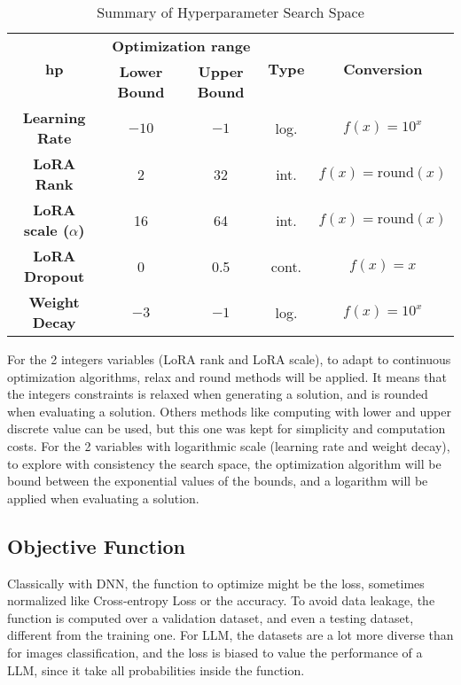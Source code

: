 \vspace*{-\baselineskip}
\begin{table}[h]
    \centering
    \begin{tabular}{|c|c|c|c|c|}
        \hline
        \multirow{2}{*}{\textbf{ \Gls{hp} }} & \multicolumn{2}{|c|}{\textbf{Optimization range}} &\multirow{2}{*}{\textbf{ Type }}& \multirow{2}{*}{\textbf{ Conversion }} \\
        \cline{2-3}
         & \textbf{ Lower Bound } & \textbf{ Upper Bound } & & \\
        \hline
        \textbf{Learning Rate} & $-10$ & $-1$ & log. & $f(x) = 10^{x}$ \\
        \hline
        \textbf{LoRA Rank} & 2 & 32 &int. &$f(x) = \text{round}(x)$ \\
        \hline
        \textbf{LoRA scale ($\alpha$)} & 16 & 64 & int. &$f(x) = \text{round}(x)$ \\
        \hline
        \textbf{LoRA Dropout} & 0 & 0.5 & cont.& $f(x) = x$ \\
        \hline
        \textbf{Weight Decay} & $-3$ & $-1$ &log.& $f(x) = 10^{x}$  \\
        \hline
    \end{tabular}
    \caption{Summary of Hyperparameter Search Space}
    \label{tab:hyperparam_table}
\end{table}\vspace*{-\baselineskip}

For the 2 integers variables (LoRA rank and LoRA scale), to adapt to continuous optimization algorithms, relax and round methods will be applied. It means that the integers constraints is relaxed when generating a solution, and is rounded when evaluating a solution. Others methods like computing with lower and upper discrete value can be used, but this one was kept for simplicity and computation costs.
For the 2 variables with logarithmic scale (learning rate and weight decay), to explore with consistency the search space, the optimization algorithm will be bound between the exponential values of the bounds, and a logarithm will be applied when evaluating a solution.


\subsection{Objective Function}
\label{sec:obj_fun}
Classically with DNN, the function to optimize might be the loss, sometimes normalized like Cross-entropy Loss or the accuracy. To avoid data leakage, the function is computed over a validation dataset, and even a testing dataset, different from the training one. For LLM, the datasets are a lot more diverse than for images classification, and the loss is biased to value the performance of a LLM, since it take all probabilities inside the function. 

